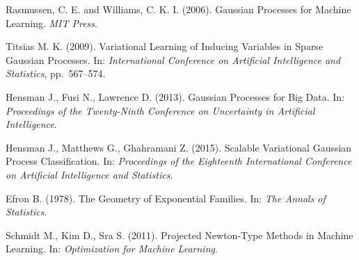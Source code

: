 \begin{thebibliography}{99}
	
	Rasmussen, C. E. and Williams, C. K. I. (2006). Gaussian Processes for Machine Learning. {\it MIT Press}.


	Titsias M. K. (2009).  Variational Learning of Inducing Variables in Sparse Gaussian
	Processes.  In: {\it International Conference on Artificial Intelligence and Statistics}, pp.~567–574.

	Hensman J., Fusi N., Lawrence D. (2013).  Gaussian Processes for Big Data.  In: {\it Proceedings of the Twenty-Ninth Conference on Uncertainty in Artificial Intelligence}.

	Hensman J., Matthews G., Ghahramani Z. (2015). Scalable Variational Gaussian Process Classification.  In: {\it Proceedings of the Eighteenth International Conference on Artificial Intelligence and Statistics}.

	Efron B. (1978). The Geometry of Exponential Families. In: {\it The Annals of Statistics}.

	Schmidt M., Kim D., Sra S. (2011). Projected Newton-Type Methods in Machine Learning. In: {\it Optimization for Machine Learning}.


\end{thebibliography}	